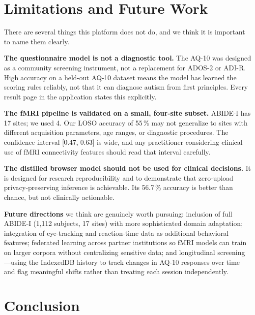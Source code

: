 \documentclass[conference]{IEEEtran}
\begin{document}
\section{Limitations and Future Work}

There are several things this platform does not do, and we think it
is important to name them clearly.

\textbf{The questionnaire model is not a diagnostic tool.} The AQ-10
was designed as a community screening instrument, not a replacement for
ADOS-2 or ADI-R. High accuracy on a held-out AQ-10 dataset means the
model has learned the scoring rules reliably, not that it can diagnose
autism from first principles. Every result page in the application
states this explicitly.

\textbf{The fMRI pipeline is validated on a small, four-site subset.}
ABIDE-I has 17 sites; we used 4. Our LOSO accuracy of 55\,\% may not
generalize to sites with different acquisition parameters, age ranges,
or diagnostic procedures. The confidence interval [0.47, 0.63] is wide,
and any practitioner considering clinical use of fMRI connectivity
features should read that interval carefully.

\textbf{The distilled browser model should not be used for clinical
decisions.} It is designed for research reproducibility and to
demonstrate that zero-upload privacy-preserving inference is achievable.
Its 56.7\,\% accuracy is better than chance, but not clinically
actionable.

\textbf{Future directions} we think are genuinely worth pursuing:
inclusion of full ABIDE-I (1,112 subjects, 17 sites) with more
sophisticated domain adaptation; integration of eye-tracking and
reaction-time data as additional behavioral features; federated learning
across partner institutions so fMRI models can train on larger corpora
without centralizing sensitive data; and longitudinal screening---using
the IndexedDB history to track changes in AQ-10 responses over time and
flag meaningful shifts rather than treating each session independently.

\section{Conclusion}
\end{document}
